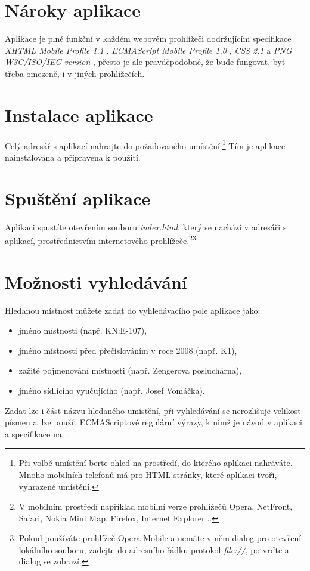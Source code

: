 \section{Nároky aplikace}
Aplikace je plně funkční v každém webovém prohlížeči dodržujícím specifikace \emph{XHTML Mobile Profile 1.1} \cite{XhtmlMpDoc}, \emph{ECMAScript Mobile Profile 1.0} \cite{EsMpDoc}, \emph{CSS 2.1} \cite{CssDoc} a \emph{PNG W3C/ISO/IEC version} \cite{PngDoc}, přesto je ale pravděpodobné, že bude fungovat, byť třeba omezeně, i v jiných prohlížečích.

\section{Instalace aplikace}
Celý adresář s aplikací nahrajte do požadovaného umístění.\footnote{Při volbě umístění berte ohled na prostředí, do kterého aplikaci nahráváte. Mnoho mobilních telefonů má pro HTML stránky, které aplikaci tvoří, vyhrazené umístění.} Tím je aplikace nainstalována a připravena k použití.

\section{Spuštění aplikace}
Aplikaci spustíte otevřením souboru \emph{index.html}, který se nachází v adresáři s aplikací, prostřednictvím internetového prohlížeče.\footnote{V mobilním prostředí například mobilní verze prohlížečů Opera, NetFront, Safari, Nokia Mini Map, Firefox, Internet Explorer...}\footnote{Pokud používáte prohlížeč Opera Mobile a nemáte v něm dialog pro otevření lokálního souboru, zadejte do adresního řádku protokol \emph{file://}, potvrďte a dialog se zobrazí.}

\section{Možnosti vyhledávání}
Hledanou místnost můžete zadat do vyhledávacího pole aplikace jako:
\begin{itemize}
 \item jméno místnosti (např. KN:E-107),
 \item jméno místnosti před přečíslováním v roce 2008 (např. K1),
 \item zažité pojmenování místnosti (např. Zengerova posluchárna),
 \item jméno sídlícího vyučujícího (např. Josef Vomáčka).
\end{itemize}
Zadat lze i část názvu hledaného umístění, při vyhledávání se nerozlišuje velikost písmen a~lze použít ECMAScriptové regulární výrazy, k nimž je návod v aplikaci a specifikace na~\cite{EsReDoc}.

